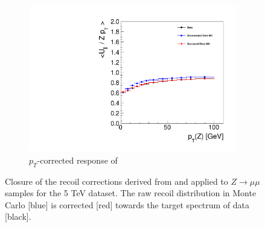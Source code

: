 \begin{figure}
\begin{subfigure}{.50\textwidth}
\includegraphics[width=\linewidth]{plots/Recoil/validation_5/response_par.pdf}
\caption{$p_T$-corrected response of \upar}
\end{subfigure}%
\caption{Closure of the recoil corrections derived from and applied to $Z\rightarrow\mu\mu$ samples for the 5 TeV dataset. The raw recoil distribution in Monte Carlo [blue] is corrected [red] towards the target spectrum of data [black].}
\label{fig:recoil:validation:5}
\end{figure}